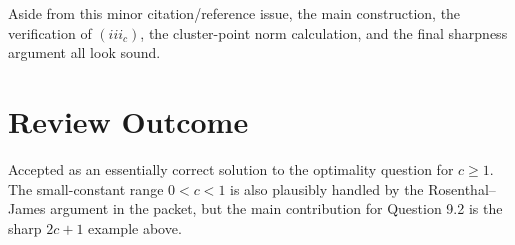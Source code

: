 \documentclass[11pt]{article}
\begin{document}
Aside from this minor citation/reference issue, the main construction, the verification of \((iii_c)\), the cluster-point norm calculation, and the final sharpness argument all look sound.

\section*{Review Outcome}

Accepted as an essentially correct solution to the optimality question for \(c\geq1\). The small-constant range \(0<c<1\) is also plausibly handled by the Rosenthal--James argument in the packet, but the main contribution for Question 9.2 is the sharp \(2c+1\) example above.
\end{document}
